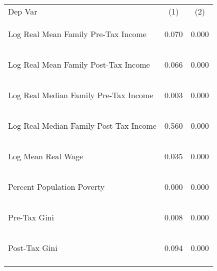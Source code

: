 \begin{center}
\begin{tabular}{lcc}
\hline \noalign{\smallskip}Dep Var & (1) & (2)\\
\noalign{\smallskip}\hline \noalign{\smallskip}Log Real Mean Family Pre-Tax Income & \begin{scriptsize}0.070\end{scriptsize} & \begin{scriptsize}0.000\end{scriptsize}\\
Log Real Mean Family Post-Tax Income & \begin{scriptsize}0.066\end{scriptsize} & \begin{scriptsize}0.000\end{scriptsize}\\
Log Real Median Family Pre-Tax Income & \begin{scriptsize}0.003\end{scriptsize} & \begin{scriptsize}0.000\end{scriptsize}\\
Log Real Median Family Post-Tax Income & \begin{scriptsize}0.560\end{scriptsize} & \begin{scriptsize}0.000\end{scriptsize}\\
Log Mean Real Wage & \begin{scriptsize}0.035\end{scriptsize} & \begin{scriptsize}0.000\end{scriptsize}\\
Percent Population Poverty & \begin{scriptsize}0.000\end{scriptsize} & \begin{scriptsize}0.000\end{scriptsize}\\
Pre-Tax Gini & \begin{scriptsize}0.008\end{scriptsize} & \begin{scriptsize}0.000\end{scriptsize}\\
Post-Tax Gini & \begin{scriptsize}0.094\end{scriptsize} & \begin{scriptsize}0.000\end{scriptsize}\\
\noalign{\smallskip}\hline\end{tabular}\\
\end{center}
